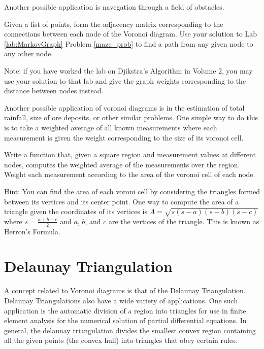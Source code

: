 Another possible application is navegation through a field of obstacles.

\begin{problem}
Given a list of points, form the adjacency matrix corresponding to the connections between each node of the Voronoi diagram.
Use your solution to Lab \ref{lab:MarkovGraph} Problem \ref{maze_prob} to find a path from any given node to any other node.

Note: if you have worked the lab on Djikstra's Algorithm in Volume 2, you may use your solution to that lab and give the graph weights corresponding to the distance between nodes instead.
\end{problem}

Another possible application of voronoi diagrams is in the estimation of total rainfall, size of ore deposits, or other similar problems.
One simple way to do this is to take a weighted average of all known measurements where each measurement is given the weight corresponding to the size of its voronoi cell.

\begin{problem}
\label{AverageRainfall}
Write a function that, given a square region and measurement values at different nodes, computes the weighted average of the measurements over the region.
Weight each measurement according to the area of the voronoi cell of each node.

Hint: You can find the area of each voroni cell by considering the triangles formed between its vertices and its center point. One way to compute the area of a triangle given the coordinates of its vertices is $A = \sqrt{s\left(s-a\right) \left(s-b\right) \left(s-c\right)}$ where $s = \frac{a+b+c}{2}$ and $a$, $b$, and $c$ are the vertices of the triangle.
This is known as Herron's Formula.
\end{problem}

\section*{Delaunay Triangulation}

A concept related to Voronoi diagrams is that of the Delaunay Triangulation.
Delaunay Triangulations also have a wide variety of applications.
One such application is the automatic division of a region into triangles for use in finite element analysis for the numerical solution of partial differential equations.
In general, the delaunay triangulation divides the smallest convex region containing all the given points (the convex hull) into triangles that obey certain rules.

